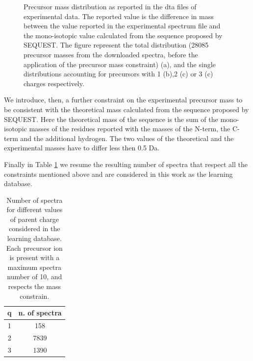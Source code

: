 \begin{figure}
\caption{\label{fig:mh-dist}
Precursor mass distribution as reported in the dta files of experimental data. The
reported value is the difference in mass between the value reported in the
experimental spectrum file and the mono-isotopic value calculated from the sequence
proposed by SEQUEST. The figure represent the total distribution (28085
precursor masses from the downloaded spectra, before the application of the
precursor mass constraint) (a), and the single distributions
accounting for precursors with 1 (b),2 (c) or 3 (c) charges respectively.}
\end{figure}

We introduce, then, a further constraint on the experimental precursor mass to be
consistent with the theoretical mass calculated from the sequence proposed by
SEQUEST. 
Here the theoretical mass of the sequence is the sum of the
mono-isotopic masses of the residues reported with the masses of the N-term, the
C-term and the additional hydrogen.
The two values of the theoretical and the experimental masses have to differ
less then 0.5 Da.

Finally in Table \ref{tab:num-spectra} we resume the resulting number of spectra
that respect all the constraints mentioned above and are considered
in this work as the learning database.

\begin{table}[!thb]
\begin{center}
\begin{tabular}{cc}
\hline
\hline
q & n. of spectra \\
\hline
1&  158  \\
2&  7839 \\
3&  1390  \\
\hline
\hline
\end{tabular}
\caption{\label{tab:num-spectra}
Number of spectra for different values of parent charge considered in the
learning database.
Each precursor ion is present with a maximum spectra number of 10, and respects
the mass constrain.}
\end{center}
\end{table}


